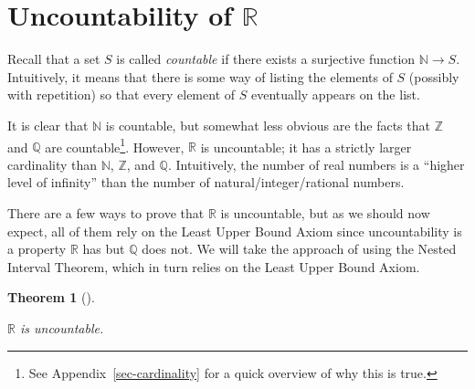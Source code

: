 \documentclass[
  letterpaper,
  DIV=11,
  numbers=noendperiod]{scrreprt}
\def\R{\mathbb R}
\def\N{\mathbb N}
\def\Q{\mathbb Q}
\def\Z{\mathbb Z}
\theoremstyle{plain}
\newtheorem{theorem}{Theorem}[chapter]
\theoremstyle{definition}
\theoremstyle{plain}
\theoremstyle{plain}
\theoremstyle{definition}
\theoremstyle{definition}
\theoremstyle{remark}
\begin{document}
\section{\texorpdfstring{Uncountability of
\(\R\)}{Uncountability of \textbackslash R}}\label{uncountability-of-r}

Recall that a set \(S\) is called \emph{countable} if there exists a
surjective function \(\N\rightarrow S\). Intuitively, it means that
there is some way of listing the elements of \(S\) (possibly with
repetition) so that every element of \(S\) eventually appears on the
list.

It is clear that \(\N\) is countable, but somewhat less obvious are the
facts that \(\Z\) and \(\Q\) are countable\footnote{See
  Appendix~\ref{sec-cardinality} for a quick overview of why this is
  true.}. However, \(\R\) is uncountable; it has a strictly larger
cardinality than \(\N\), \(\Z\), and \(\Q\). Intuitively, the number of
real numbers is a ``higher level of infinity'' than the number of
natural/integer/rational numbers.

There are a few ways to prove that \(\R\) is uncountable, but as we
should now expect, all of them rely on the Least Upper Bound Axiom since
uncountability is a property \(\R\) has but \(\Q\) does not. We will
take the approach of using the Nested Interval Theorem, which in turn
relies on the Least Upper Bound Axiom.

\begin{theorem}[]\protect\hypertarget{thm-r-uncountable}{}\label{thm-r-uncountable}

\(\R\) is uncountable.

\end{theorem}
\end{document}
